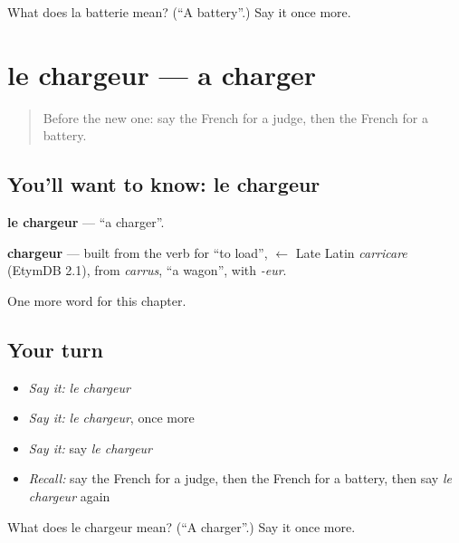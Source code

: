 \begin{tcolorbox}[breakable,colback=teal!4,colframe=teal!35!black,title={Before you move on}]
What does la batterie mean? (\textquotedblleft{}A battery\textquotedblright{}.) Say it once more.
\end{tcolorbox}
\section[le chargeur]{le chargeur — a charger}

\label{lesson:FR-C223-chargeur}



\begin{quote}
Before the new one: say the French for a judge, then the French for a battery.
\end{quote}

\subsection*{You'll want to know: le chargeur}
\textbf{le chargeur} — \textquotedblleft{}a charger\textquotedblright{}.

\begin{cousinweb}
\textbf{chargeur} — built from the verb for \textquotedblleft{}to load\textquotedblright{}, $\leftarrow$ Late Latin \emph{carricare} (EtymDB 2.1), from \emph{carrus}, \textquotedblleft{}a wagon\textquotedblright{}, with \emph{-eur}.
\end{cousinweb}

\begin{grammarlens}[title={What you've built}]
One more word for this chapter.
\end{grammarlens}

\subsection*{Your turn}
\begin{itemize}
\raggedright
  \item \emph{Say it:} \emph{le chargeur}
  \item \emph{Say it:} \emph{le chargeur}, once more
  \item \emph{Say it:} say \emph{le chargeur}
  \item \emph{Recall:} say the French for a judge, then the French for a battery, then say \emph{le chargeur} again
\end{itemize}

\begin{tcolorbox}[breakable,colback=teal!4,colframe=teal!35!black,title={Before you move on}]
What does le chargeur mean? (\textquotedblleft{}A charger\textquotedblright{}.) Say it once more.
\end{tcolorbox}
